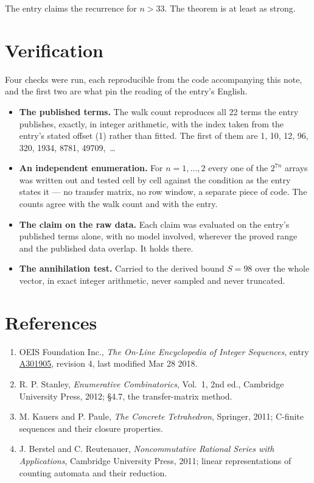 \documentclass[11pt]{article}
\theoremstyle{definition}
\begin{document}
The entry claims the recurrence for $n > 33$. The theorem is at least as strong.

\section{Verification}

Four checks were run, each reproducible from the code accompanying this note, and the first two are what pin the reading of the entry's English.

\begin{itemize}

\item {\bfseries The published terms.} The walk count reproduces all 22 terms the entry publishes, exactly, in integer arithmetic, with the index taken from the entry's stated offset (1) rather than fitted. The first of them are 1, 10, 12, 96, 320, 1934, 8781, 49709,~\dots

\item {\bfseries An independent enumeration.} For $n = 1,\dots,2$ every one of the $2^{7n}$ arrays was written out and tested cell by cell against the condition as the entry states it --- no transfer matrix, no row window, a separate piece of code. The counts agree with the walk count and with the entry.

\item {\bfseries The claim on the raw data.} Each claim was evaluated on the entry's published terms alone, with no model involved, wherever the proved range and the published data overlap. It holds there.

\item {\bfseries The annihilation test.} Carried to the derived bound $S = 98$ over the whole vector, in exact integer arithmetic, never sampled and never truncated.

\end{itemize}

\section{References}

\begin{enumerate}

\item OEIS Foundation Inc., \emph{The On-Line Encyclopedia of Integer Sequences}, entry \href{https://oeis.org/A301905}{A301905}, revision 4, last modified Mar 28 2018.

\item R. P. Stanley, \emph{Enumerative Combinatorics}, Vol.~1, 2nd ed., Cambridge University Press, 2012; \S4.7, the transfer-matrix method.

\item M. Kauers and P. Paule, \emph{The Concrete Tetrahedron}, Springer, 2011; C-finite sequences and their closure properties.

\item J. Berstel and C. Reutenauer, \emph{Noncommutative Rational Series with Applications}, Cambridge University Press, 2011; linear representations of counting automata and their reduction.

\end{enumerate}
\end{document}
